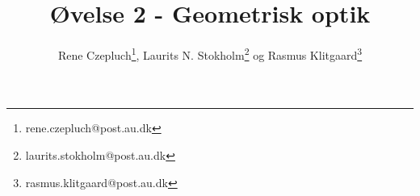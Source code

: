 \documentclass[danish,a4paper,twocolumn, oneside]{memoir}
\title{Øvelse 2 - Geometrisk optik}
\author{Rene Czepluch\thanks{rene.czepluch@post.au.dk}, Laurits N. Stokholm\thanks{laurits.stokholm@post.au.dk} og Rasmus Klitgaard\thanks{rasmus.klitgaard@post.au.dk}}
\date
\begin{document}
\newcommand{\forsogEt}{forsøg 1, afbildning med én samlelinse}
\newcommand{\forsogTo}{forsøg 2, forstørrelsesglas}

\maketitle
\noindent







\end{document}
